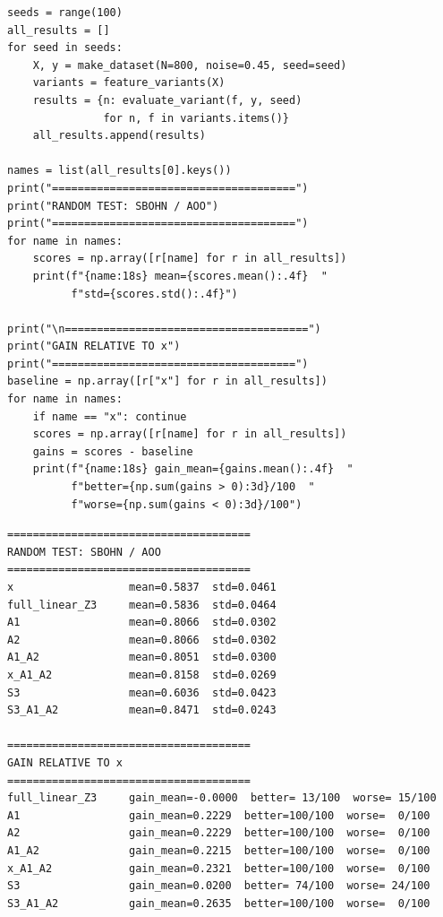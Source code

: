 \documentclass[11pt,a4paper]{report}
\begin{document}
\begin{lstlisting}[caption=SBOHN Experiment 7: random coordinates and weights]
seeds = range(100)
all_results = []
for seed in seeds:
    X, y = make_dataset(N=800, noise=0.45, seed=seed)
    variants = feature_variants(X)
    results = {n: evaluate_variant(f, y, seed)
               for n, f in variants.items()}
    all_results.append(results)

names = list(all_results[0].keys())
print("======================================")
print("RANDOM TEST: SBOHN / AOO")
print("======================================")
for name in names:
    scores = np.array([r[name] for r in all_results])
    print(f"{name:18s} mean={scores.mean():.4f}  "
          f"std={scores.std():.4f}")

print("\n======================================")
print("GAIN RELATIVE TO x")
print("======================================")
baseline = np.array([r["x"] for r in all_results])
for name in names:
    if name == "x": continue
    scores = np.array([r[name] for r in all_results])
    gains = scores - baseline
    print(f"{name:18s} gain_mean={gains.mean():.4f}  "
          f"better={np.sum(gains > 0):3d}/100  "
          f"worse={np.sum(gains < 0):3d}/100")
\end{lstlisting}

\label{app:ch3-lst16}
\begin{lstlisting}[style=textstyle, caption=Result of SBOHN-7 experiment]
======================================
RANDOM TEST: SBOHN / AOO
======================================
x                  mean=0.5837  std=0.0461
full_linear_Z3     mean=0.5836  std=0.0464
A1                 mean=0.8066  std=0.0302
A2                 mean=0.8066  std=0.0302
A1_A2              mean=0.8051  std=0.0300
x_A1_A2            mean=0.8158  std=0.0269
S3                 mean=0.6036  std=0.0423
S3_A1_A2           mean=0.8471  std=0.0243

======================================
GAIN RELATIVE TO x
======================================
full_linear_Z3     gain_mean=-0.0000  better= 13/100  worse= 15/100
A1                 gain_mean=0.2229  better=100/100  worse=  0/100
A2                 gain_mean=0.2229  better=100/100  worse=  0/100
A1_A2              gain_mean=0.2215  better=100/100  worse=  0/100
x_A1_A2            gain_mean=0.2321  better=100/100  worse=  0/100
S3                 gain_mean=0.0200  better= 74/100  worse= 24/100
S3_A1_A2           gain_mean=0.2635  better=100/100  worse=  0/100
\end{lstlisting}
\end{document}
